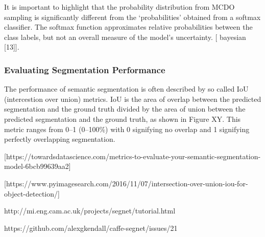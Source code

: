 It is important to highlight that the probability distribution from MCDO sampling is significantly different from the ‘probabilities’ obtained from a softmax classifier. The softmax function approximates relative probabilities between the class labels, but not an overall measure of the model’s uncertainty. [ bayesian [13]].

\subsubsection{Evaluating Segmentation Performance}

The performance of semantic segmentation is often described by so called IoU (intercestion over union) metrics. IoU is the area of overlap between the predicted segmentation and the ground truth divided by the area of union between the predicted segmentation and the ground truth, as shown in Figure XY. This metric ranges from 0–1 (0–100\%) with 0 signifying no overlap and 1 signifying perfectly overlapping segmentation.

[https://towardsdatascience.com/metrics-to-evaluate-your-semantic-segmentation-model-6bcb99639aa2]

[https://www.pyimagesearch.com/2016/11/07/intersection-over-union-iou-for-object-detection/]

http://mi.eng.cam.ac.uk/projects/segnet/tutorial.html

https://github.com/alexgkendall/caffe-segnet/issues/21





